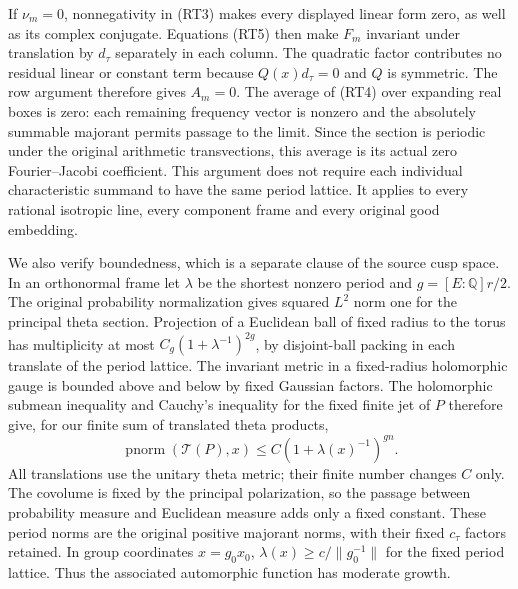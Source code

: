 If $\nu_m=0$, nonnegativity in \textup{(RT3)} makes every displayed
linear form zero, as well as its complex conjugate.
Equations \textup{(RT5)} then make $F_m$ invariant under translation
by $d_\tau$ separately in each column.  The quadratic factor contributes
no residual linear or constant term because $Q(x)d_\tau=0$ and $Q$ is
symmetric.  The row argument therefore gives $A_m=0$.
The average of \textup{(RT4)} over expanding real boxes is zero:
each remaining frequency vector is nonzero and the absolutely summable
majorant permits passage to the limit.  Since the section is periodic
under the original arithmetic transvections, this average is its actual
zero Fourier--Jacobi coefficient.  This argument does not require each
individual characteristic summand to have the same period lattice.
It applies to every rational isotropic line, every component frame and
every original good embedding.\cite{raw-theta-cusp-source}

We also verify boundedness, which is a separate clause of the source
cusp space.  In an orthonormal frame let $\lambda$ be the shortest
nonzero period and $g=[E:\mathbb Q]r/2$.  The original probability
normalization gives squared $L^2$ norm one for the principal theta
section.  Projection of a Euclidean ball of fixed radius to the torus
has multiplicity at most $C_g(1+\lambda^{-1})^{2g}$,
by disjoint-ball packing in each translate of the period lattice.
The invariant metric in a fixed-radius holomorphic gauge is bounded
above and below by fixed Gaussian factors.  The holomorphic submean
inequality and Cauchy's inequality for the fixed finite jet of $P$
therefore give, for our finite sum of translated theta products,
\[
       \operatorname{pnorm}(\mathcal T(P),x)
           \le C(1+\lambda(x)^{-1})^{gn}.                \tag{RT6}
\]
All translations use the unitary theta metric; their finite number
changes $C$ only.  The covolume is fixed by the principal polarization,
so the passage between probability measure and Euclidean measure adds
only a fixed constant.  These period norms are the original positive
majorant norms, with their fixed $c_\tau$ factors retained.
In group coordinates $x=g_0x_0$,
$\lambda(x)\ge c/\|g_0^{-1}\|$ for the fixed period lattice.
Thus the associated automorphic function has moderate growth.

